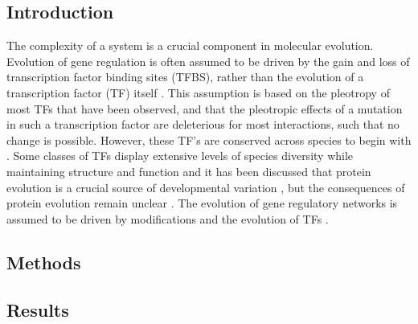 \documentclass[10pt,a4paper]{article}
\begin{document}
	\subsection*{Introduction}
	The complexity of a system is a crucial component in molecular evolution. Evolution of gene regulation is often assumed to be driven by the gain and loss of transcription factor binding sites (TFBS), rather than the evolution of a transcription factor (TF) itself \cite{tugrul_dynamics_2015}. This assumption is based on the pleotropy of most TFs that have been observed, and that the pleotropic effects of a mutation in such a transcription factor are deleterious for most interactions, such that no change is possible. However, these TF's are conserved across species to begin with \cite{schmidt_five-vertebrate_2010}. Some classes of TFs display extensive levels of species diversity while maintaining structure and function \cite{nowick_lineage-specific_2010} and it has been discussed that protein evolution is a crucial source of developmental variation \cite{lynch_resurrecting_2008}, but the consequences of protein evolution remain unclear \cite{wagner_gene_2008, voordeckers_how_2015}. The evolution of gene regulatory networks is assumed to be driven by modifications 
	and the evolution of TFs \cite{lozada-chavez_bacterial_2006, perez_evolution_2009}.
	
	\subsection*{Methods}
	

	

	\subsection*{Results}
\end{document}

